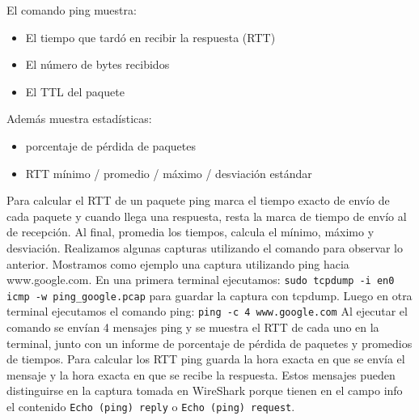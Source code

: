 \documentclass[12pt]{article} %
\begin{document}
El comando ping muestra:
\begin{itemize}
    \item El tiempo que tardó en recibir la respuesta (RTT)
    \item El número de bytes recibidos
    \item El TTL del paquete 
\end{itemize}
Además muestra estadísticas:
\begin{itemize}
    \item porcentaje de pérdida de paquetes
    \item RTT mínimo / promedio / máximo / desviación estándar
\end{itemize}
\newline
Para calcular el RTT de un paquete ping marca el tiempo exacto de envío de cada paquete y cuando llega una respuesta, resta la marca de tiempo de envío al de recepción. Al final, promedia los tiempos, calcula el mínimo, máximo y desviación.
\newline
\newline
Realizamos algunas capturas utilizando el comando para observar lo anterior. Mostramos como ejemplo una captura utilizando ping hacia www.google.com.
\newline
\newline
En una primera terminal ejecutamos: \verb|sudo tcpdump -i en0 icmp -w ping_google.pcap| para guardar la captura con tcpdump.
\newline
Luego en otra terminal ejecutamos el comando ping: \texttt{ping -c 4 www.google.com}
\newline
\newline
Al ejecutar el comando se envían 4 mensajes ping y se muestra el RTT de cada uno en la terminal, junto con un informe de porcentaje de pérdida de paquetes y promedios de tiempos. Para calcular los RTT ping guarda la hora exacta en que se envía el mensaje y la hora exacta en que se recibe la respuesta. Estos mensajes pueden distinguirse en la captura tomada en WireShark porque tienen en el campo info el contenido \texttt{Echo (ping) reply} o \texttt{Echo (ping) request}.

\end{document}

